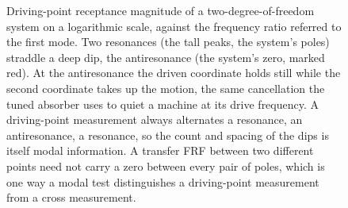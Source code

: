 \begin{figure}[htbp]
\centering
{}
\caption[Antiresonance in a driving-point FRF]{Driving-point receptance
magnitude of a two-degree-of-freedom system on a logarithmic scale,
against the frequency ratio referred to the first mode. Two resonances
(the tall peaks, the system's poles) straddle a deep dip, the
antiresonance (the system's zero, marked red). At the antiresonance the
driven coordinate holds still while the second coordinate takes up the
motion, the same cancellation the tuned absorber uses to quiet a machine
at its drive frequency. A driving-point measurement always alternates a
resonance, an antiresonance, a resonance, so the count and spacing of
the dips is itself modal information. A transfer FRF between two
different points need not carry a zero between every pair of poles, which
is one way a modal test distinguishes a driving-point measurement from a
cross measurement.}
\label{fig:vol03ch06:anti-resonance}
\end{figure}
